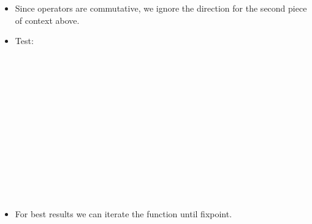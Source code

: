 \documentclass{beamer}
\newcommand{\tmverbatim}[1]{\text{{\ttfamily{#1}}}}
\begin{document}
\begin{itemize}
  \item Since operators are commutative, we ignore the direction for the
  second piece of context above.
  
  \item Test:
  
  {}{\hlopt{(+) }}{}{\hlopt{= }}{}{\hlopt{(}}{}{\hlopt{, }}{}{\hlopt{,
  }}{}{\hlopt{)}}{\hlendline{}}\\
  {}{\hlopt{( * ) }}{}{\hlopt{= }}{}{\hlopt{(}}{}{\hlopt{, }}{}{\hlopt{,
  }}{}{\hlopt{)}}{\hlendline{}}\\
  {}{\hlopt{(!) }}{}{\hlopt{= }}{}{}{\hlendline{}}\\
  {}{}{\hlopt{= }}{}{}{\hlendline{}}\\
  {}{}{\hlopt{= }}{}{}{\hlendline{}}\\
  {}{}{\hlopt{= !}}{}{\hlopt{+ }}{}{\hlopt{* (!}}{}{\hlopt{+ }}{}{\hlopt{) * (!}}{}{\hlopt{+ }}{}{\hlopt{)}}{\hlendline{}}\\
  {}{}{\hlopt{= }}{}{\hlopt{(}}{}{}{\hlopt{->}}{}{\hlopt{=}}{}{\hlopt{)
  }}{}{\hlendline{}}\\
  {}{}{\hlopt{=}}{\hlendline{}}\\
  {\hlstd{ \ }}{}{}{}{\hlendline{}}\\
  {\hlstd{ \ }}{\hlopt{\textbar }}{}{\hlopt{-> }}{}{}{\hlendline{}}\\
  {\hlstd{ \ }}{\hlopt{\textbar }}{}{}{\hlopt{->
  }}{}{\hlendline{}}\\
  {\hlstd{\# }}{}{\hlstd{{\textunderscore} }}{\hlopt{=
  }}{}{\hlopt{;;}}{\hlendline{}}\\
  {\hlopt{- : }}{}{\hlopt{=
  }}{}{\hlendline{}}
  
  \item For best results we can iterate the \tmverbatim{pull\_out} function
  until fixpoint.
\end{itemize}
\end{document}
